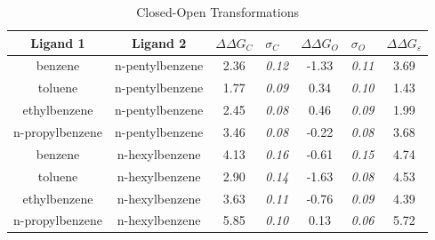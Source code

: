 \documentclass[T4paper.tex]{subfiles}
\begin{document}
\begin{table}[!htb]
\centering
\caption{Closed-Open Transformations}
\label{tbl:C-O}
\begin{tabular}{|c|c|c|l|c|l|c|}
\hline
\textbf{Ligand 1}       & \textbf{Ligand 2}    & {\color[HTML]{800080} \boldmath$\Delta\Delta G_{C}$} & {\color[HTML]{800080} \boldmath$\sigma_{C}$} & {\color[HTML]{008000} \boldmath$\Delta\Delta G_{O}$} & {\color[HTML]{008000} \boldmath$\sigma_{O}$} & \boldmath$\Delta\Delta G_{\varepsilon}$ \\ \hline
benzene         & n-pentylbenzene & 2.36                                   & \textit{0.12}                       & -1.33                                & \textit{0.11}                       & \cellcolor[HTML]{FFCCC9}3.69 \\ \hline
toluene         & n-pentylbenzene & 1.77                                   & \textit{0.09}                       & 0.34                                 & \textit{0.10}                       & \cellcolor[HTML]{FFCCC9}1.43 \\ \hline
ethylbenzene    & n-pentylbenzene & 2.45                                   & \textit{0.08}                       & 0.46                                 & \textit{0.09}                       & \cellcolor[HTML]{FFCCC9}1.99 \\ \hline
n-propylbenzene & n-pentylbenzene & 3.46                                   & \textit{0.08}                       & -0.22                                & \textit{0.08}                       & \cellcolor[HTML]{FFCCC9}3.68 \\ \hline
benzene         & n-hexylbenzene  & 4.13                                   & \textit{0.16}                       & -0.61                                & \textit{0.15}                       & \cellcolor[HTML]{FFCCC9}4.74 \\ \hline
toluene         & n-hexylbenzene  & 2.90                                   & \textit{0.14}                       & -1.63                                & \textit{0.08}                       & \cellcolor[HTML]{FFCCC9}4.53 \\ \hline
ethylbenzene    & n-hexylbenzene  & 3.63                                   & \textit{0.11}                       & -0.76                                & \textit{0.09}                       & \cellcolor[HTML]{FFCCC9}4.39 \\ \hline
n-propylbenzene & n-hexylbenzene  & 5.85                                   & \textit{0.10}                       & 0.13                                 & \textit{0.06}                       & \cellcolor[HTML]{FFCCC9}5.72 \\ \hline
\end{tabular}

\end{table}
\end{document}
